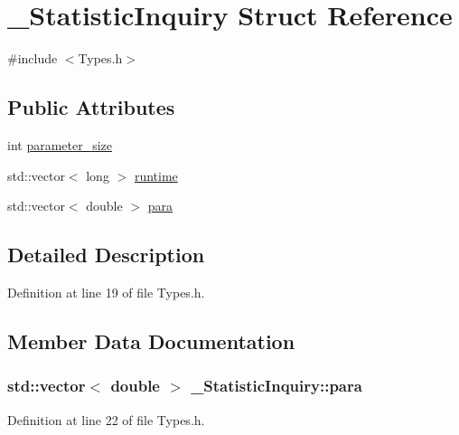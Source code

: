 \hypertarget{struct___statistic_inquiry}{}\section{\+\_\+\+Statistic\+Inquiry Struct Reference}
\label{struct___statistic_inquiry}


{\ttfamily \#include $<$Types.\+h$>$}

\subsection*{Public Attributes}
\begin{DoxyCompactItemize}
\item 
int \hyperlink{struct___statistic_inquiry_a3934f5fbc4dfd91f51203ce53648a9e1}{parameter\+\_\+size}
\item 
std\+::vector$<$ long $>$ \hyperlink{struct___statistic_inquiry_a90d5c25e5f7b26fd17e95d06c51a8758}{runtime}
\item 
std\+::vector$<$ double $>$ \hyperlink{struct___statistic_inquiry_ac310959ba057c4348ba74bae050d2c68}{para}
\end{DoxyCompactItemize}


\subsection{Detailed Description}


Definition at line 19 of file Types.\+h.



\subsection{Member Data Documentation}
\hypertarget{struct___statistic_inquiry_ac310959ba057c4348ba74bae050d2c68}{}
\subsubsection[{para}]{\setlength{\rightskip}{0pt plus 5cm}std\+::vector$<$ double $>$ \+\_\+\+Statistic\+Inquiry\+::para}\label{struct___statistic_inquiry_ac310959ba057c4348ba74bae050d2c68}


Definition at line 22 of file Types.\+h.

\hypertarget{struct___statistic_inquiry_a3934f5fbc4dfd91f51203ce53648a9e1}{}
